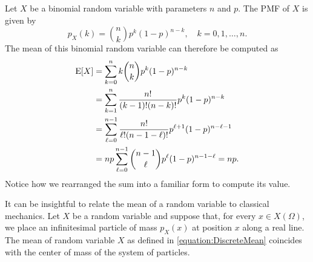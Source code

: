 \begin{example}
Let $X$ be a binomial random variable with parameters $n$ and $p$.
The PMF of $X$ is given by
\begin{equation*}
p_X (k) = \binom{n}{k} p^k (1-p)^{n-k}, \quad k = 0, 1, \ldots, n.
\end{equation*}
The mean of this binomial random variable can therefore be computed as
\begin{equation*}
\begin{split}
\mathrm{E} [X] &= \sum_{k=0}^n k \binom{n}{k} p^k (1-p)^{n-k} \\
&= \sum_{k=1}^n \frac{n!}{(k-1)!(n-k)!} p^k (1-p)^{n-k} \\
&= \sum_{\ell=0}^{n-1} \frac{n!}{\ell!(n-1-\ell)!} p^{\ell+1} (1-p)^{n-\ell-1} \\
&= n p \sum_{\ell=0}^{n-1} \binom{n-1}{\ell} p^{\ell} (1-p)^{n-1-\ell}
= n p .
\end{split}
\end{equation*}
Notice how we rearranged the sum into a familiar form to compute its value.
\end{example}

It can be insightful to relate the mean of a random variable to classical mechanics.
Let $X$ be a random variable and suppose that, for every $x \in X(\Omega)$, we place an infinitesimal particle of mass $p_X(x)$ at position $x$ along a real line.
The mean of random variable $X$ as defined in \eqref{equation:DiscreteMean} coincides with the center of mass of the system of particles.

